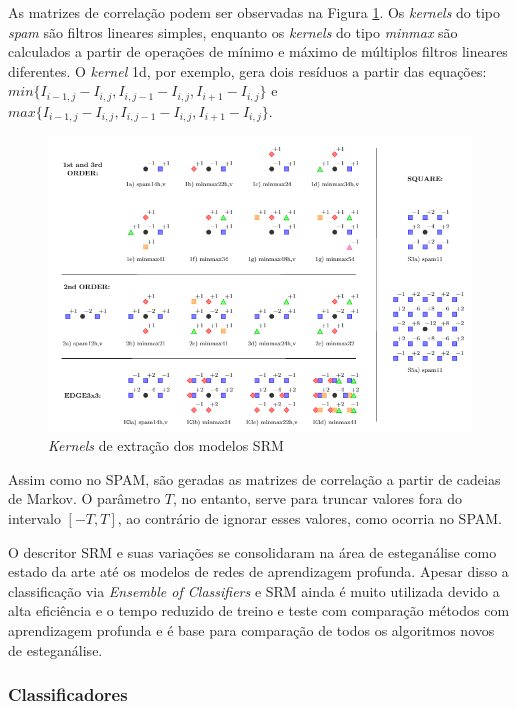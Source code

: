 As matrizes de correlação podem ser observadas na Figura \ref{fig:srm}. Os \textit{kernels} do tipo \textit{spam} são filtros lineares simples, enquanto os \textit{kernels} do tipo \textit{minmax} são calculados a partir de operações de mínimo e máximo de múltiplos filtros lineares diferentes. O \textit{kernel} 1d, por exemplo, gera dois resíduos a partir das equações: $min\{I_{i-1, j} - I_{i,j} , I_{i,j-1} - I_{i,j}, I_{i+1} - I_{i,j}\}$ e $max\{I_{i-1, j} - I_{i,j}, I_{i,j-1} - I_{i,j}, I_{i+1} - I_{i,j}\}$.

\begin{figure}[!htb]
	\centering
    \includegraphics[width=\textwidth]{dados/figuras/kernels_srm.png}
    \caption{\textit{Kernels} de extração dos modelos SRM \cite{fridrich2012rich}}
    \label{fig:srm}
\end{figure}

Assim como no SPAM, são geradas as matrizes de correlação a partir de cadeias de Markov. O parâmetro $T$, no entanto, serve para truncar valores fora do intervalo $[-T, T]$, ao contrário de ignorar esses valores, como ocorria no SPAM.

O descritor SRM e suas variações se consolidaram na área de esteganálise como estado da arte até os modelos de redes de aprendizagem profunda. Apesar disso a classificação via \textit{Ensemble of Classifiers} e SRM ainda é muito utilizada devido a alta eficiência e o tempo reduzido de treino e teste com comparação métodos com aprendizagem profunda e é base para comparação de todos os algoritmos novos de esteganálise.


\subsubsection{Classificadores}
\label{subsec:classificadores}

